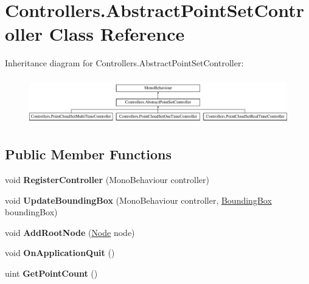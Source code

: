 \hypertarget{class_controllers_1_1_abstract_point_set_controller}{}\section{Controllers.\+Abstract\+Point\+Set\+Controller Class Reference}
\label{class_controllers_1_1_abstract_point_set_controller}
Inheritance diagram for Controllers.\+Abstract\+Point\+Set\+Controller\+:\begin{figure}[H]
\begin{center}
\leavevmode
\includegraphics[height=2.043796cm]{class_controllers_1_1_abstract_point_set_controller}
\end{center}
\end{figure}
\subsection*{Public Member Functions}
\begin{DoxyCompactItemize}
\item 
\mbox{\label{class_controllers_1_1_abstract_point_set_controller_a8bfeeed26c2cbc95ecfc3906fe39d932}} 
void {\bfseries Register\+Controller} (Mono\+Behaviour controller)
\item 
\mbox{\label{class_controllers_1_1_abstract_point_set_controller_a10ea36265d82091cd92355ed64c2581c}} 
void {\bfseries Update\+Bounding\+Box} (Mono\+Behaviour controller, \hyperlink{class_cloud_data_1_1_bounding_box}{Bounding\+Box} bounding\+Box)
\item 
\mbox{\label{class_controllers_1_1_abstract_point_set_controller_aafa007a9fb523364254042ce85abbaf0}} 
void {\bfseries Add\+Root\+Node} (\hyperlink{class_cloud_data_1_1_node}{Node} node)
\item 
\mbox{\label{class_controllers_1_1_abstract_point_set_controller_a702c76d6d9a81a5a2878aafa428f8615}} 
void {\bfseries On\+Application\+Quit} ()
\item 
\mbox{\label{class_controllers_1_1_abstract_point_set_controller_a82db4e310b3d53990ca4ebffddd45bea}} 
uint {\bfseries Get\+Point\+Count} ()
\end{DoxyCompactItemize}
